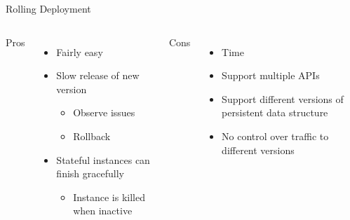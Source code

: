 \documentclass{slide}
\begin{document}
\begin{frame}{Rolling Deployment}
    \vspace{1pt}
    \begin{columns}[t]
      \huge Pros
      {\LARGE
        \begin{itemize}
            \item Fairly easy
            \vspace{1mm}
            \item { Slow release of new version\\}
            \begin{itemize}
                \Large\item Observe issues
                \vspace{0.7mm}
                \Large\item Rollback
            \end{itemize}
            \vspace{1mm}
            \item { Stateful instances can finish gracefully\\}
            \vspace{1mm}
            \begin{itemize}
                \Large\item { Instance is killed when inactive\\}
            \end{itemize}
        \end{itemize}
      }
      \huge Cons
      {\LARGE
        \begin{itemize}
            \item Time
            \item Support multiple APIs
            \item { Support different versions of persistent data structure\\}
            \item { No control over traffic to different versions\\}
        \end{itemize}
      }
    \end{columns}
\end{frame}
\end{document}

